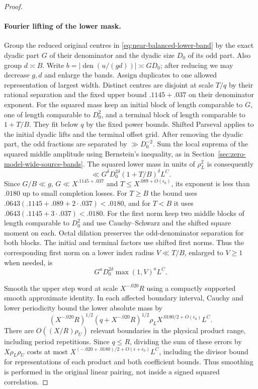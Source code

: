 \documentclass[11pt,a4paper]{article}
\theoremstyle{paperplain}
\numberwithin{equation}{section}
\begin{document}
\begin{proof}
\paragraph{Fourier lifting of the lower mask.}
Group the reduced original centres in \eqref{eq:near-balanced-lower-band}
by the exact dyadic part $G$ of their denominator and the
dyadic size $D_0$ of its odd part. Also group $d\asymp B$.
Write $b=|\operatorname{den}(u/(gd))|\asymp GD_0$;
after reducing we may decrease $g,d$ and enlarge the bands.
Assign duplicates to one allowed representation of largest
width. Distinct centres are disjoint at scale $T/q$ by their
rational separation and the fixed upper bound $.1145+.037$
on their denominator exponent. For the squared mass keep an initial
block of length comparable to $G$, one of length comparable to $D_0^2$,
and a terminal block of length comparable to $1+T/B$. They fit below
$q$ by the fixed power bounds. Shifted Parseval applies to the initial
dyadic lifts and the terminal offset grid. After removing the dyadic
part, the odd fractions are separated by $\gg D_0^{-2}$. Sum the local
suprema of the squared middle amplitude using Bernstein's inequality,
as in Section~\ref{sec:zero-model-wide-source-bands}. The squared lower
mass in units of $\rho_L^2$ is consequently
\[
                  \ll G^\delta D_0^{2\delta}(1+T/B)^\delta L^C.
\]
Since $G/B\ll g$, $G\ll X^{.1145+.037}$ and
$T\le X^{.089+O(\epsilon_0)}$, its exponent is less than $.0180$
up to small completion losses. For $T\ge B$ the bound uses
$.0643(.1145+.089+2\cdot.037)<.0180$, and for $T<B$ it uses
$.0643(.1145+3\cdot.037)<.0180$.
For the first norm keep two middle blocks of length comparable
to $D_0^2$ and use Cauchy--Schwarz and the shifted square moment on
each. Octal dilation preserves the odd-denominator separation for
both blocks. The initial and terminal factors use shifted first norms. Thus the corresponding
first norm on a lower index radius $V\ll T/B$, enlarged to
$V\ge1$ when needed, is
\begin{equation}\label{eq:near-balanced-band-first-norm}
           G^a D_0^{2\delta} \max(1,V)^a L^C .
\end{equation}

Smooth the upper step word at scale $X^{-.020}R$ using
a compactly supported smooth approximate identity. In each
affected boundary interval, Cauchy and lower periodicity
bound the lower absolute mass by
\[
 (X^{-.020}R)^{1/2}(q+X^{-.020}R)^{1/2}
                       \rho_L X^{.0180/2+O(\epsilon_0)}L^C .
\]
There are $O((X/R)\rho_U)$ relevant boundaries in the
physical product range, including period repetitions.
Since $q\le R$, dividing the sum of these errors by $X\rho_L\rho_U$
costs at most $X^{(-.020+.0180)/2+O(\epsilon+\epsilon_0)}L^C$,
including the divisor bound for representations of each product and
both coefficient bounds. Thus smoothing is performed in the original
linear pairing, not inside a signed squared correlation.


\end{proof}
\end{document}
